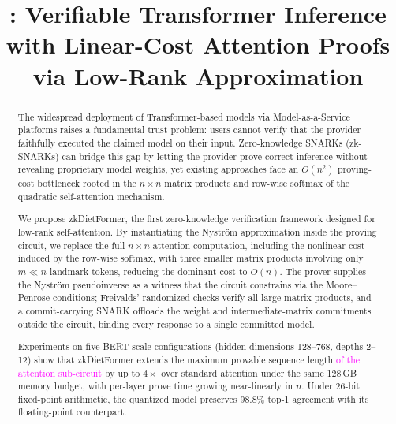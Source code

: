 \documentclass[sigconf,anonymous,review,balance=false]{acmart}
\newcommand{\rev}[1]{{\color{magenta}#1}}
\begin{document}
\title{\bf \name: Verifiable Transformer Inference with Linear-Cost Attention Proofs via Low-Rank Approximation}




\renewcommand{\shortauthors}{Trovato et al.}

\begin{abstract}
The widespread deployment of Transformer-based models via Model-as-a-Service platforms raises a fundamental trust problem: users cannot verify that the provider faithfully executed the claimed model on their input. Zero-knowledge SNARKs (zk-SNARKs) can bridge this gap by letting the provider prove correct inference without revealing proprietary model weights, \rev{yet existing approaches face an $O(n^2)$ proving-cost bottleneck rooted in the $n\times n$ matrix products and row-wise softmax of the quadratic self-attention mechanism.}
        
We propose zkDietFormer, the first zero-knowledge verification framework designed for low-rank self-attention. By instantiating the Nystr\"{o}m approximation inside the proving circuit, we replace the full $n \times n$ attention computation, including the nonlinear cost induced by the row-wise softmax, with three smaller matrix products involving only $m \ll n$ landmark tokens, reducing the dominant cost to $O(n)$. \rev{The prover supplies the Nystr\"{o}m pseudoinverse as a witness that the circuit constrains via the Moore--Penrose conditions; Freivalds' randomized checks verify all large matrix products, and a commit-carrying SNARK offloads the weight and intermediate-matrix commitments outside the circuit, binding every response to a single committed model.}
        
Experiments on five BERT-scale configurations (hidden dimensions 128--768, depths 2--12) show that zkDietFormer extends the maximum provable sequence length \textcolor{magenta}{of the attention sub-circuit} by up to $4\times$ over standard attention under the same 128\,GB memory budget, with per-layer prove time growing near-linearly in $n$. Under 26-bit fixed-point arithmetic, the quantized model preserves 98.8\% top-1 agreement with its floating-point counterpart.
        
\end{abstract}
\end{document}
